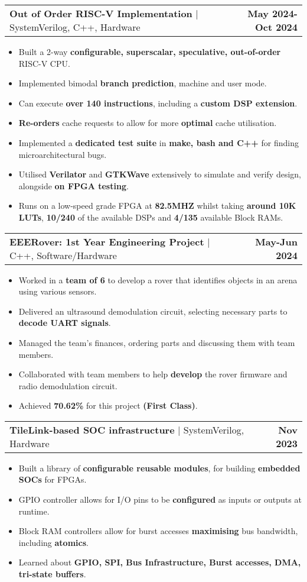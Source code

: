 \documentclass[a4paper,11pt]{article}
\makeatletter
\newcommand{\resumeItem}[1]{
  \item\small{
    {#1 \vspace{-2pt}}
  }
}
\newcommand{\resumeProjectHeading}[2]{
    \item
    \begin{tabular*}{1.001\textwidth}{l@{\extracolsep{\fill}}r}
      \small#1 & \textbf{\small #2}\\
    \end{tabular*}\vspace{-7pt}
}
\newcommand{\resumeItemListStart}{\begin{itemize}}
\newcommand{\resumeItemListEnd}{\end{itemize}\vspace{-5pt}}
\makeatother
\begin{document}
\resumeProjectHeading {\textbf{Out of Order RISC-V Implementation} \href{https://github.com/AyuubMohamud/Biriq}{\scalebox{0.75}\faLink} $|$ SystemVerilog, C++, Hardware} {May 2024-Oct 2024}
\resumeItemListStart
\resumeItem{Built a 2-way \textbf{configurable, superscalar, speculative, out-of-order} RISC-V CPU.}
\resumeItem{Implemented bimodal\textbf{ branch prediction}, machine and user mode.}
\resumeItem{Can execute \textbf{over 140 instructions}, including a \textbf{custom DSP extension}.}
\resumeItem{\textbf{Re-orders} cache requests to allow for more \textbf{optimal} cache utilisation.}
\resumeItem{Implemented a\textbf{ dedicated test suite} \href{https://github.com/AyuubMohamud/biriqTests}{\scalebox{0.75}\faLink}  in \textbf{make, bash and C++} for finding microarchitectural bugs.}
\resumeItem{Utilised\textbf{ Verilator} and \textbf{GTKWave} extensively to simulate and verify design, alongside \textbf{on FPGA testing}.}
\resumeItem{Runs on a low-speed grade FPGA at \textbf{82.5MHZ} whilst taking \textbf{around 10K LUTs}, \textbf{10/240} of the available DSPs and \textbf{4/135} available Block RAMs.}
\resumeItemListEnd

\resumeProjectHeading{\textbf{EEERover: 1st Year Engineering Project} $|$ C++, Software/Hardware}{May-Jun 2024}
\resumeItemListStart
\resumeItem{Worked in a \textbf{team of 6} to develop a rover that identifies objects in an arena using various sensors.}
\resumeItem{Delivered an ultrasound demodulation circuit, selecting necessary parts to \textbf{decode UART signals}.}
\resumeItem{Managed the team's finances, ordering parts and discussing them with team members.}
\resumeItem{Collaborated with team members to help \textbf{develop} the rover firmware and radio demodulation circuit.}
\resumeItem{Achieved \textbf{70.62\%} for this project \textbf{(First Class)}.}
\resumeItemListEnd

\resumeProjectHeading{\textbf{TileLink-based SOC infrastructure} \href{https://github.com/AyuubMohamud/TileLinkIP}{\scalebox{0.75}\faLink} $|$ SystemVerilog, Hardware }{Nov 2023}
\resumeItemListStart
\resumeItem{Built a library of \textbf{configurable reusable modules}, for building \textbf{embedded SOCs} for FPGAs.}
\resumeItem{GPIO controller allows for I/O pins to be \textbf{configured} as inputs or outputs at runtime.}
\resumeItem{Block RAM controllers allow for burst accesses \textbf{maximising} bus bandwidth, including \textbf{atomics}.}
\resumeItem{Learned about \textbf{GPIO, SPI, Bus Infrastructure, Burst accesses, DMA, tri-state buffers}.}
\resumeItemListEnd
\end{document}
